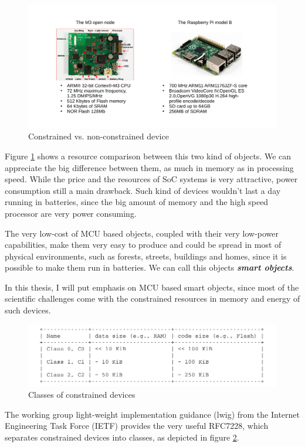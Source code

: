 \begin{figure}[htb]
	\centering
	\includegraphics[width=1\columnwidth]{chapters/background.images/BoardsComparison.pdf}
	\caption{Constrained vs. non-constrained device}
	\label{fig:BoardsComparison}
\end{figure}

Figure \ref{fig:BoardsComparison} shows a resource comparison between this two kind of objects.
We can appreciate the big difference between them, as much in memory as in processing speed.
While the price and the resources of SoC systems is very attractive, power consumption still a main drawback.
Such kind of devices wouldn't last a day running in batteries, since the big amount of memory and the high speed processor are very power consuming.

The very low-cost of MCU based objects, coupled with their very low-power capabilities, make them very easy to produce and could be spread in most of physical environments, such as forests, streets, buildings and homes, since it is possible to make them run in batteries.
We can call this objects \textit{\textbf{smart objects}}.

In this thesis, I will put emphasis on MCU based smart objects, since most of the scientific challenges come with the constrained resources in memory and energy of such devices.
\begin{figure}[htb]
	\centering
	\includegraphics[width=1\columnwidth]{chapters/background.images/DeviceClass.pdf}
	\caption{Classes of constrained devices}
	\label{fig:DeviceClass}
\end{figure}
The working group light-weight implementation guidance (lwig) from the Internet Engineering Task Force (IETF) provides the very useful RFC7228\cite{rfc7228}, which separates constrained devices into classes, as depicted in figure \ref{fig:DeviceClass}.

